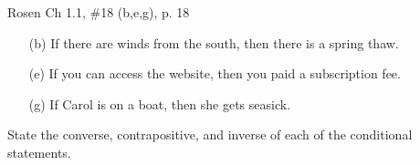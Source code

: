 \documentclass[12pt]{exam}
\newenvironment{my_parts}{
\begin{parts}
    \setlength{\itemsep}{1pt}
    \setlength{\parskip}{0pt}
    \setlength{\parsep}{0pt}
}{\end{parts}}
\begin{document}
\begin{questions}
\question Rosen Ch 1.1, \#18 (b,e,g), p. 18
    \begin{solution}
        \begin{itemize}
        \item[(b)] If there are winds from the south, then there is a spring thaw.
        \item[(e)] If you can access the website, then you paid a subscription fee.
        \item[(g)] If Carol is on a boat, then she gets seasick.
        \end{itemize}
    \end{solution}

\question State the converse, contrapositive, and inverse of each of the conditional statements.
    \begin{solution}
\end{solution}
\end{questions}
\end{document}
